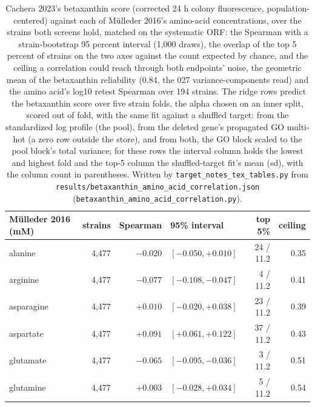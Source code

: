 \begin{table}[H]
  \centering
  \footnotesize
  \caption[Betaxanthin against the amino-acid pool]{Cachera 2023's betaxanthin score (corrected 24 h colony fluorescence, population-centered) against each of M\"ulleder 2016's amino-acid concentrations, over the strains both screens hold, matched on the systematic ORF: the Spearman with a strain-bootstrap 95 percent interval (1,000 draws), the overlap of the top 5 percent of strains on the two axes against the count expected by chance, and the ceiling a correlation could reach through both endpoints' noise, the geometric mean of the betaxanthin reliability (0.84, the 027 variance-components read) and the amino acid's log10 retest Spearman over 194 strains. The ridge rows predict the betaxanthin score over five strain folds, the alpha chosen on an inner split, scored out of fold, with the same fit against a shuffled target: from the standardized log profile (the pool), from the deleted gene's propagated GO multi-hot (a zero row outside the store), and from both, the GO block scaled to the pool block's total variance; for these rows the interval column holds the lowest and highest fold and the top-5 column the shuffled-target fit's mean (sd), with the column count in parentheses. Written by \texttt{target\_notes\_tex\_tables.py} from \texttt{results/betaxanthin\_amino\_acid\_correlation.json} (\texttt{betaxanthin\_amino\_acid\_correlation.py}).}
  \label{tab:betaxanthin-amino-acid-correlation}
  \begin{tabular}{@{}lrrlrr@{}}
    \hline
    M\"ulleder 2016 (mM) & strains & Spearman & 95\% interval & top 5\% & ceiling \\
    \hline
    alanine & 4,477 & $-0.020$ & $[-0.050, +0.010]$ & 24 / 11.2 & 0.35 \\
    arginine & 4,477 & $-0.077$ & $[-0.108, -0.047]$ & 4 / 11.2 & 0.41 \\
    asparagine & 4,477 & $+0.010$ & $[-0.020, +0.038]$ & 23 / 11.2 & 0.39 \\
    aspartate & 4,477 & $+0.091$ & $[+0.061, +0.122]$ & 37 / 11.2 & 0.43 \\
    glutamate & 4,477 & $-0.065$ & $[-0.095, -0.036]$ & 3 / 11.2 & 0.51 \\
    glutamine & 4,477 & $+0.003$ & $[-0.028, +0.034]$ & 5 / 11.2 & 0.54 \\

\end{tabular}
\end{table}
